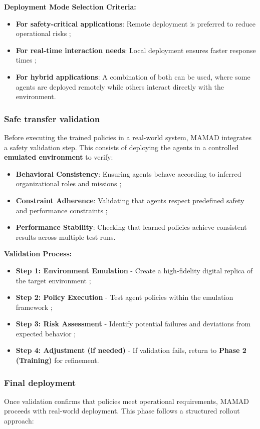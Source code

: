 \documentclass[journal]{IEEEtai}
\begin{document}
\noindent \textbf{Deployment Mode Selection Criteria:}
\begin{itemize}
    \item \textbf{For safety-critical applications}: Remote deployment is preferred to reduce operational risks ;
    \item \textbf{For real-time interaction needs}: Local deployment ensures faster response times ;
    \item \textbf{For hybrid applications}: A combination of both can be used, where some agents are deployed remotely while others interact directly with the environment.
\end{itemize}

\subsubsection{Safe transfer validation}
Before executing the trained policies in a real-world system, MAMAD integrates a safety validation step. This consists of deploying the agents in a controlled \textbf{emulated environment} to verify:
\begin{itemize}
    \item \textbf{Behavioral Consistency}: Ensuring agents behave according to inferred organizational roles and missions ;
    \item \textbf{Constraint Adherence}: Validating that agents respect predefined safety and performance constraints ;
    \item \textbf{Performance Stability}: Checking that learned policies achieve consistent results across multiple test runs.
\end{itemize}

\noindent \textbf{Validation Process:}
\begin{itemize}
    \item \textbf{Step 1: Environment Emulation} - Create a high-fidelity digital replica of the target environment ;
    \item \textbf{Step 2: Policy Execution} - Test agent policies within the emulation framework ;
    \item \textbf{Step 3: Risk Assessment} - Identify potential failures and deviations from expected behavior ;
    \item \textbf{Step 4: Adjustment (if needed)} - If validation fails, return to \textbf{Phase 2 (Training)} for refinement.
\end{itemize}

\subsubsection{Final deployment}
Once validation confirms that policies meet operational requirements, MAMAD proceeds with real-world deployment. This phase follows a structured rollout approach:
\end{document}
